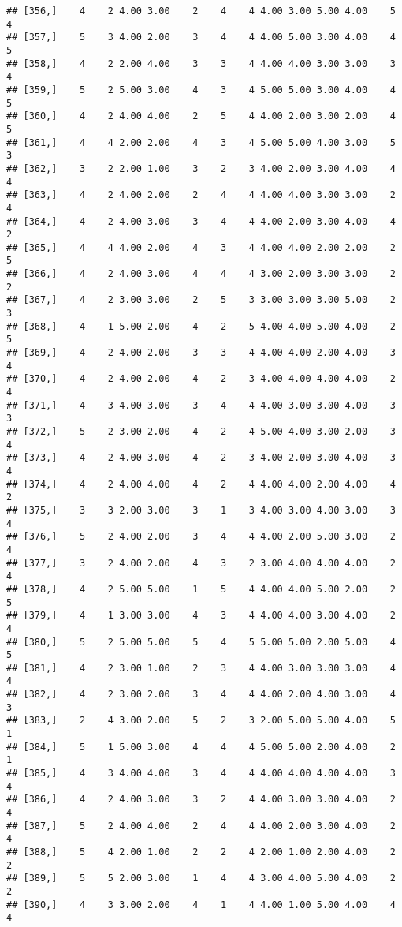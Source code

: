 \documentclass[]{article}
\begin{document}
\begin{verbatim}
## [356,]    4    2 4.00 3.00    2    4    4 4.00 3.00 5.00 4.00    5    4
## [357,]    5    3 4.00 2.00    3    4    4 4.00 5.00 3.00 4.00    4    5
## [358,]    4    2 2.00 4.00    3    3    4 4.00 4.00 3.00 3.00    3    4
## [359,]    5    2 5.00 3.00    4    3    4 5.00 5.00 3.00 4.00    4    5
## [360,]    4    2 4.00 4.00    2    5    4 4.00 2.00 3.00 2.00    4    5
## [361,]    4    4 2.00 2.00    4    3    4 5.00 5.00 4.00 3.00    5    3
## [362,]    3    2 2.00 1.00    3    2    3 4.00 2.00 3.00 4.00    4    4
## [363,]    4    2 4.00 2.00    2    4    4 4.00 4.00 3.00 3.00    2    4
## [364,]    4    2 4.00 3.00    3    4    4 4.00 2.00 3.00 4.00    4    2
## [365,]    4    4 4.00 2.00    4    3    4 4.00 4.00 2.00 2.00    2    5
## [366,]    4    2 4.00 3.00    4    4    4 3.00 2.00 3.00 3.00    2    2
## [367,]    4    2 3.00 3.00    2    5    3 3.00 3.00 3.00 5.00    2    3
## [368,]    4    1 5.00 2.00    4    2    5 4.00 4.00 5.00 4.00    2    5
## [369,]    4    2 4.00 2.00    3    3    4 4.00 4.00 2.00 4.00    3    4
## [370,]    4    2 4.00 2.00    4    2    3 4.00 4.00 4.00 4.00    2    4
## [371,]    4    3 4.00 3.00    3    4    4 4.00 3.00 3.00 4.00    3    3
## [372,]    5    2 3.00 2.00    4    2    4 5.00 4.00 3.00 2.00    3    4
## [373,]    4    2 4.00 3.00    4    2    3 4.00 2.00 3.00 4.00    3    4
## [374,]    4    2 4.00 4.00    4    2    4 4.00 4.00 2.00 4.00    4    2
## [375,]    3    3 2.00 3.00    3    1    3 4.00 3.00 4.00 3.00    3    4
## [376,]    5    2 4.00 2.00    3    4    4 4.00 2.00 5.00 3.00    2    4
## [377,]    3    2 4.00 2.00    4    3    2 3.00 4.00 4.00 4.00    2    4
## [378,]    4    2 5.00 5.00    1    5    4 4.00 4.00 5.00 2.00    2    5
## [379,]    4    1 3.00 3.00    4    3    4 4.00 4.00 3.00 4.00    2    4
## [380,]    5    2 5.00 5.00    5    4    5 5.00 5.00 2.00 5.00    4    5
## [381,]    4    2 3.00 1.00    2    3    4 4.00 3.00 3.00 3.00    4    4
## [382,]    4    2 3.00 2.00    3    4    4 4.00 2.00 4.00 3.00    4    3
## [383,]    2    4 3.00 2.00    5    2    3 2.00 5.00 5.00 4.00    5    1
## [384,]    5    1 5.00 3.00    4    4    4 5.00 5.00 2.00 4.00    2    1
## [385,]    4    3 4.00 4.00    3    4    4 4.00 4.00 4.00 4.00    3    4
## [386,]    4    2 4.00 3.00    3    2    4 4.00 3.00 3.00 4.00    2    4
## [387,]    5    2 4.00 4.00    2    4    4 4.00 2.00 3.00 4.00    2    4
## [388,]    5    4 2.00 1.00    2    2    4 2.00 1.00 2.00 4.00    2    2
## [389,]    5    5 2.00 3.00    1    4    4 3.00 4.00 5.00 4.00    2    2
## [390,]    4    3 3.00 2.00    4    1    4 4.00 1.00 5.00 4.00    4    4

\end{verbatim}
\end{document}
